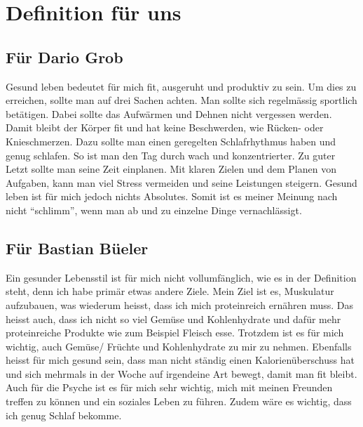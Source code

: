\section{Definition für uns}
\subsection{Für Dario Grob}
\authortoc{\dario}{\subsectionident}
Gesund leben bedeutet für mich fit, ausgeruht und produktiv zu sein. Um dies zu erreichen, sollte man auf drei Sachen achten. 
\newline
Man sollte sich regelmässig sportlich betätigen. Dabei sollte das Aufwärmen und Dehnen nicht vergessen werden. Damit bleibt der Körper fit und hat keine Beschwerden, wie Rücken- oder Knieschmerzen.
\newline
Dazu sollte man einen geregelten Schlafrhythmus haben und genug schlafen. So ist man den Tag durch wach und konzentrierter.
\newline
Zu guter Letzt sollte man seine Zeit einplanen. Mit klaren Zielen und dem Planen von Aufgaben, kann man viel Stress vermeiden und seine Leistungen steigern.
\newline
Gesund leben ist für mich jedoch nichts Absolutes. Somit ist es meiner Meinung nach nicht “schlimm”, wenn man ab und zu einzelne Dinge vernachlässigt.
\subsection{Für Bastian Büeler}
\authortoc{\bastian}{\subsectionident}
Ein gesunder Lebensstil ist für mich nicht vollumfänglich, wie es in der Definition steht, denn ich habe primär etwas andere Ziele. Mein Ziel ist es, Muskulatur aufzubauen, was wiederum heisst, dass ich mich proteinreich ernähren muss. Das heisst auch, dass ich nicht so viel Gemüse und Kohlenhydrate und dafür mehr proteinreiche Produkte wie zum Beispiel Fleisch esse. Trotzdem ist es für mich wichtig, auch Gemüse/ Früchte und Kohlenhydrate zu mir zu nehmen. Ebenfalls heisst für mich gesund sein, dass man nicht ständig einen Kalorienüberschuss hat und sich mehrmals in der Woche auf irgendeine Art bewegt, damit man fit bleibt. Auch für die Psyche ist es für mich sehr wichtig, mich mit meinen Freunden treffen zu können und ein soziales Leben zu führen. Zudem wäre es wichtig, dass ich genug Schlaf bekomme.
